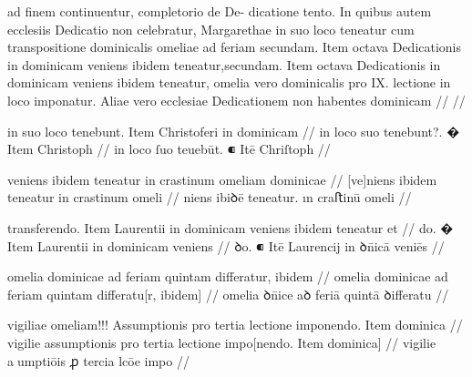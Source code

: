 \ex \bg
\gla
{}
ad finem continuentur, completorio de De-
dicatione tento.
In quibus autem ecclesiis Dedicatio non celebratur, Margarethae
in suo loco teneatur cum transpositione dominicalis omeliae ad feriam
secundam.
Item octava Dedicationis in dominicam veniens ibidem teneatur,secundam.
Item octava Dedicationis in dominicam veniens ibidem teneatur,
omelia vero dominicalis pro IX. lectione in loco imponatur. Aliae vero
ecclesiae Dedicationem non habentes dominicam
//
\glRekonstrukcja
{}
//
\endgl
\eg



\ex \bg
\gla
{}
in suo loco {} tenebunt.
{} Item Christoferi in dominicam 
//
\glRekonstrukcja
{}
in {} loco suo tenebunt?.
� Item Christoph 
//
\glU
{}
in {} loco ſuo teuebūt. ⁌ Itē Chriſtoph 
//
\endgl
\eg



\ex \bg
\gla
{}
veniens ibidem teneatur in crastinum
omeliam dominicae 
//
\glRekonstrukcja
{}
[ve]niens ibidem teneatur in crastinum
omeli
//
\glU
{}
niens ibiꝺē teneatur. ın craﬅinū omeli
//
\endgl
\eg



\ex \bg
\gla
{}
transferendo.
{} Item Laurentii in dominicam veniens ibidem teneatur et 
//
\glRekonstrukcja
{}
do.
� Item Laurentii in dominicam veniens
//
\glU
{}
ꝺo. ⁌ Itē Laurencij in ꝺn̄icā veniēs
//
\endgl
\eg



\ex \bg
\gla
{}
omelia
dominicae ad feriam quintam differatur, ibidem 
//
\glRekonstrukcja
{}
omelia
dominicae ad feriam quintam differatu[r, ibidem]
//
\glU
{}
omelia ꝺn̄ice aꝺ feriā quintā ꝺiﬀeratu
//
\endgl
\eg



\ex \bg
\gla
{}
vigiliae omeliam!!! Assumptionis pro tertia lectione imponendo. Item dominica 
//
\glRekonstrukcja
{}
vigilie {} assumptionis pro tertia lectione impo[nendo. Item dominica] 
//
\glU
{}
vigilie {} aumptiōis ꝓ tercia lcōe impo  
//
\endgl
\eg



